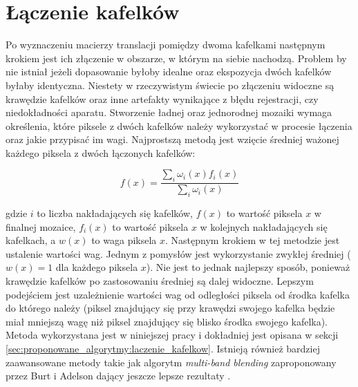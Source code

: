 \section{Łączenie kafelków}
\label{sec:algorytmy_korejestracji:laczenie_kafelkow}

Po wyznaczeniu macierzy translacji pomiędzy dwoma kafelkami następnym krokiem jest ich złączenie w obszarze, w którym na siebie nachodzą. Problem by nie istniał jeżeli dopasowanie byłoby idealne oraz ekspozycja dwóch kafelków byłaby identyczna. Niestety w rzeczywistym świecie po złączeniu widoczne są krawędzie kafelków oraz inne artefakty wynikające z błędu rejestracji, czy niedokładności aparatu. Stworzenie ładnej oraz jednorodnej mozaiki wymaga określenia, które piksele z dwóch kafelków należy wykorzystać w procesie łączenia oraz jakie przypisać im wagi. Najprostszą metodą jest wzięcie średniej ważonej każdego piksela z dwóch łączonych kafelków:

\begin{equation}
f(x)=\frac{\sum_{i}\omega_{i}(x)f_{i}(x)}{\sum_{i}\omega_{i}(x)}
\label{eq:blending}
\end{equation}

gdzie $i$ to liczba nakładających się kafelków, $f(x)$ to wartość piksela $x$ w finalnej mozaice, $f_{i}(x)$ to wartość piksela $x$ w kolejnych nakładających się kafelkach, a $w(x)$ to waga piksela $x$. Następnym krokiem w tej metodzie jest ustalenie wartości wag. Jednym z pomysłów jest wykorzystanie zwykłej średniej ($w(x)=1$ dla każdego piksela $x$). Nie jest to jednak najlepszy sposób, ponieważ krawędzie kafelków po zastosowaniu średniej są dalej widoczne. Lepszym podejściem jest uzależnienie wartości wag od odległości piksela od środka kafelka do którego należy (piksel znajdujący się przy krawędzi swojego kafelka będzie miał mniejszą wagę niż piksel znajdujący się blisko środka swojego kafelka). Metoda wykorzystana jest w niniejszej pracy i dokładniej jest opisana w sekcji \ref{sec:proponowane_algorytmy:laczenie_kafelkow}. Istnieją również bardziej zaawansowane metody takie jak algorytm \textit{multi-band blending} zaproponowany przez Burt i Adelson \cite{Burt:1983:MSA:245.247} dający jeszcze lepsze rezultaty \cite{Brown:2007:API:1265138.1265141}.

















